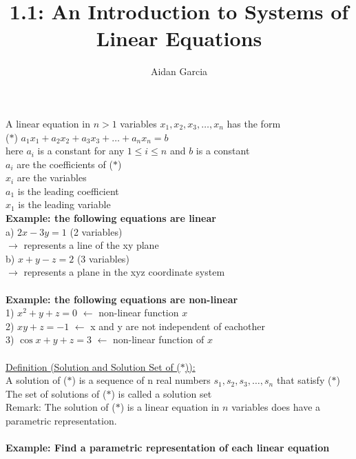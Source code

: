 \documentclass{jhwhw}
\author{Aidan Garcia}
\title{1.1: An Introduction to Systems of Linear Equations}
\begin{document}
A linear equation in \(n>1\) variables \(x_1,x_2,x_3,\ldots,x_n\) has the form
\\
(\(\ast\)) \(a_1 x_1 + a_2 x_2 + a_3 x_3 +\ldots+a_n x_n=b\)
\\

here \(a_i\) is a constant for any \(1 \leq i \leq n\) and \(b\) is a constant
\\

\(a_i\) are the coefficients of (\(\ast\)) \\
\(x_i\) are the variables \\
\(a_1\) is the leading coefficient \\
\(x_1\) is the leading variable
\\

\textbf{Example: the following equations are linear}
\\
a) \(2x-3y=1\) (2 variables) \\
\(\rightarrow\) represents a line of the xy plane 
\\
b) \(x+y-z=2\) (3 variables) \\
\(\rightarrow\) represents a plane in the xyz coordinate system
\\ \\

\textbf{Example: the following equations are non-linear}
\\
1) \( \boxed{x^2} + y + z =0\) \(\leftarrow\) non-linear function \(x\)
\\
2) \(\boxed{xy} + z = -1\) \(\leftarrow\) x and y are not independent of eachother
\\
3) \(\boxed{\cos x} + y + z = 3\) \(\leftarrow\) non-linear function of \(x\)
\\ \\

\underline{Definition (Solution and Solution Set of (\(\ast\))):}
\\

A solution of (\(\ast\)) is a sequence of n real numbers  \(s_1, s_2, s_3,\ldots,s_n\) that satisfy  (\(\ast\))
\\

The set of solutions of (\(\ast\)) is called a solution set
\\

Remark: The solution of (\(\ast\)) is a linear equation in \(n\) variables does have a parametric representation.
\\ \\

\textbf{Example: Find a parametric representation of each linear equation}
\\
\end{document}

